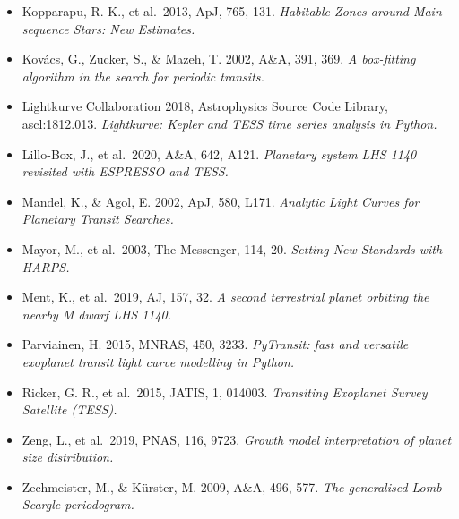 \documentclass[twocolumn,aps,pra,11pt]{revtex4-2}
\begin{document}
\begin{itemize}[leftmargin=1.2em,itemsep=1pt,label={}]
  \item Kopparapu, R. K., et al.\ 2013, ApJ, 765, 131. \emph{Habitable Zones around Main-sequence Stars: New Estimates.}
  \item Kov\'acs, G., Zucker, S., \& Mazeh, T. 2002, A\&A, 391, 369. \emph{A box-fitting algorithm in the search for periodic transits.}
  \item Lightkurve Collaboration 2018, Astrophysics Source Code Library, ascl:1812.013. \emph{Lightkurve: Kepler and TESS time series analysis in Python.}
  \item Lillo-Box, J., et al.\ 2020, A\&A, 642, A121. \emph{Planetary system LHS 1140 revisited with ESPRESSO and TESS.}
  \item Mandel, K., \& Agol, E. 2002, ApJ, 580, L171. \emph{Analytic Light Curves for Planetary Transit Searches.}
  \item Mayor, M., et al.\ 2003, The Messenger, 114, 20. \emph{Setting New Standards with HARPS.}
  \item Ment, K., et al.\ 2019, AJ, 157, 32. \emph{A second terrestrial planet orbiting the nearby M dwarf LHS 1140.}
  \item Parviainen, H. 2015, MNRAS, 450, 3233. \emph{PyTransit: fast and versatile exoplanet transit light curve modelling in Python.}
  \item Ricker, G. R., et al.\ 2015, JATIS, 1, 014003. \emph{Transiting Exoplanet Survey Satellite (TESS).}
  \item Zeng, L., et al.\ 2019, PNAS, 116, 9723. \emph{Growth model interpretation of planet size distribution.}
  \item Zechmeister, M., \& K\"urster, M. 2009, A\&A, 496, 577. \emph{The generalised Lomb-Scargle periodogram.}
\end{itemize}
\end{document}
